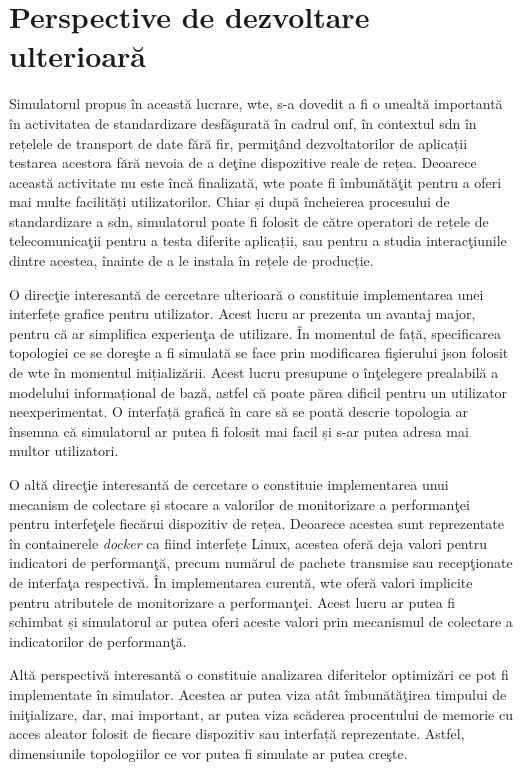 \section{Perspective de dezvoltare ulterioară}

Simulatorul propus în această lucrare, \gls{wte}, s-a dovedit a fi o unealtă importantă în activitatea de standardizare desfăşurată în cadrul \gls{onf}, în contextul \gls{sdn} în rețelele de transport de date fără fir, permiţând dezvoltatorilor de aplicații testarea acestora fără nevoia de a deţine dispozitive reale de rețea. Deoarece această activitate nu este încă finalizată, \gls{wte} poate fi îmbunătăţit pentru a oferi mai multe facilități utilizatorilor. Chiar și după încheierea procesului de standardizare a \gls{sdn}, simulatorul poate fi folosit de către operatori de rețele de telecomunicaţii pentru a testa diferite aplicații, sau pentru a studia interacţiunile dintre acestea, înainte de a le instala în rețele de producție.

O direcţie interesantă de cercetare ulterioară o constituie implementarea unei interfețe grafice pentru utilizator. Acest lucru ar prezenta un avantaj major, pentru că ar simplifica experienţa de utilizare. În momentul de față, specificarea topologiei ce se doreşte a fi simulată se face prin modificarea fişierului \gls{json} folosit de \gls{wte} în momentul inițializării. Acest lucru presupune o înţelegere prealabilă a modelului informațional de bază, astfel că poate părea dificil pentru un utilizator neexperimentat. O interfață grafică în care să se poată descrie topologia ar însemna că simulatorul ar putea fi folosit mai facil și s-ar putea adresa mai multor utilizatori.

O altă direcţie interesantă de cercetare o constituie implementarea unui mecanism de colectare și stocare a valorilor de monitorizare a performanţei pentru interfeţele fiecărui dispozitiv de rețea. Deoarece acestea sunt reprezentate în containerele \textit{docker} ca fiind interfețe Linux, acestea oferă deja valori pentru indicatori de performanţă, precum numărul de pachete transmise sau recepţionate de interfaţa respectivă. În implementarea curentă, \gls{wte} oferă valori implicite pentru atributele de monitorizare a performanţei. Acest lucru ar putea fi schimbat și simulatorul ar putea oferi aceste valori prin mecanismul de colectare a indicatorilor de performanţă.

Altă perspectivă interesantă o constituie analizarea diferitelor optimizări ce pot fi implementate în simulator. Acestea ar putea viza atât îmbunătăţirea timpului de iniţializare, dar, mai important, ar putea viza scăderea procentului de memorie cu acces aleator folosit de fiecare dispozitiv sau interfață reprezentate. Astfel, dimensiunile topologiilor ce vor putea fi simulate ar putea creşte.


